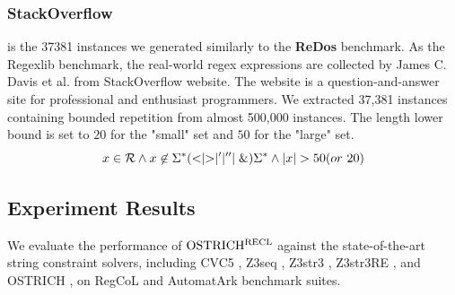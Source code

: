 {  \subsubsection{StackOverflow} is the 37381 instances we generated similarly to the \textbf{ReDos} benchmark. As the Regexlib benchmark, the real-world regex expressions are collected by James C. Davis et al.\cite{regex_lingua_franca} from StackOverflow website\cite{stackoverflow}. The website is a question-and-answer site for professional and enthusiast programmers. We extracted 37,381 instances containing bounded repetition from almost 500,000 instances. The length lower bound is set to $20$ for the "small" set and $50$ for the "large" set.
  \begin{equation} \label{eq:template}
    x\in \mathcal{R} \wedge x\not\in \Sigma^*(<\mid >\mid '\mid ''\mid \&)\Sigma^*\wedge |x| > 50(or \ 20)
  \end{equation}
}

\vspace{-2mm}
\subsection{Experiment Results}
\vspace{-1mm}

We evaluate the performance of $\rm OSTRICH^{RECL}$ against the state-of-the-art string constraint solvers, including CVC5
\cite{cvc5}, Z3seq \cite{z3seq}, Z3str3
\cite{z3str3}, Z3str3RE \cite{z3str3re}, and OSTRICH
\cite{ostrich2023}, on RegCoL and AutomatArk benchmark suites.
%

